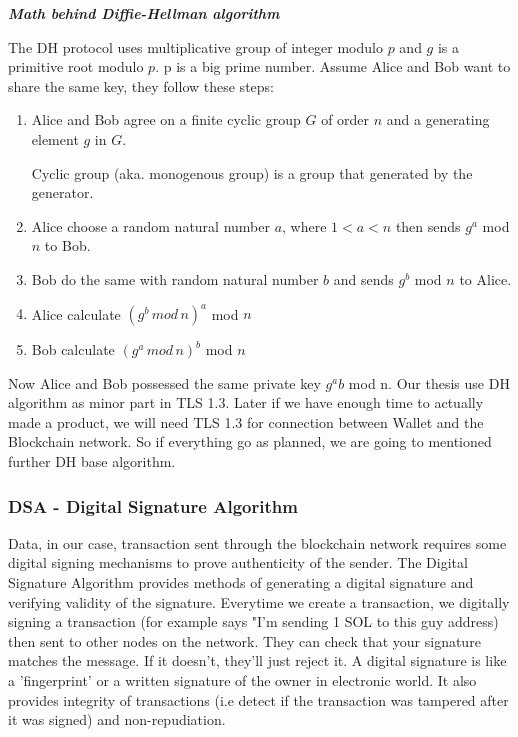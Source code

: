 \bigskip
{\textit {\textbf{Math behind Diffie-Hellman algorithm}}}

The DH protocol uses multiplicative group of integer modulo $p$ and $g$ is a primitive root modulo $p$.
p is a big prime number.
Assume Alice and Bob want to share the same key, they follow these steps:
\begin{enumerate}
	\item Alice and Bob agree on a finite cyclic group $G$ of order $n$ and a generating element $g$ in $G$. 
	\begin{definition}
		Cyclic group (aka. monogenous group) is a group that generated by the generator.
	\end{definition}
	\item Alice choose a random natural number $a$, where $1 < a < n$ then sends $g^a$ mod $n$ to Bob.
	\item Bob do the same with random natural number $b$ and sends $g^b$ mod $n$ to Alice.
	\item Alice calculate $(g^b \, mod \, n)^a$ mod $n$
	\item Bob calculate $(g^a \, mod \, n)^b$ mod $n$
\end{enumerate}
Now Alice and Bob possessed the same private key $g^ab$ mod n.
Our thesis use DH algorithm as minor part in TLS 1.3. 
Later if we have enough time to actually made a product, we will need TLS 1.3 for connection between Wallet and the Blockchain network.
So if everything go as planned, we are going to mentioned further DH base algorithm.

\subsubsection{DSA - Digital Signature Algorithm}
Data, in our case, transaction sent through the blockchain network requires some digital signing mechanisms to prove authenticity of the sender.
The Digital Signature Algorithm provides methods of generating a digital signature and verifying validity of the signature.
Everytime we create a transaction, we digitally signing a transaction (for example says "I'm sending 1 SOL to this guy address) then sent to other nodes on the network. 
They can check that your signature matches the message. If it doesn’t, they’ll just reject it.
A digital signature is like a 'fingerprint' or a written signature of the owner in electronic world. 
It also provides integrity of transactions (i.e detect if the transaction was tampered after it was signed) and non-repudiation.

